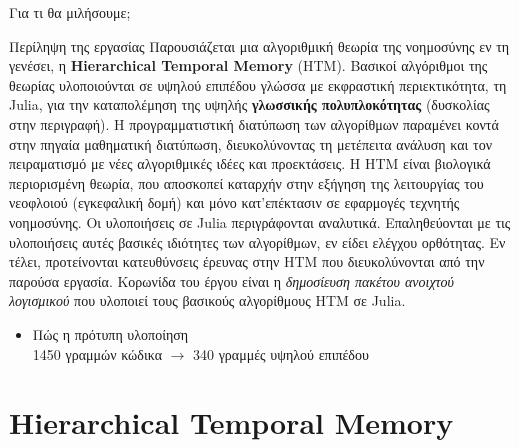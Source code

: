 \documentclass[10pt,lualatex]{beamer}
\title{\huge{\titlestring}}
\author{\authorstring\\
Επιβλέπων καθηγητής: Νίκος Πιτσιάνης}
\date{13 Ιουνίου 2019}
\begin{document}
\begin{frame}%
  \titlepage
\end{frame}

\begin{frame}{Για τι θα μιλήσουμε;}
	\begin{block}{Περίληψη της εργασίας}
		\scriptsize
		\justifying
    Παρουσιάζεται μια αλγοριθμική θεωρία της νοημοσύνης εν τη γενέσει, η \textbf{Hierarchical Temporal Memory} (HTM).
    \alert{\small Βασικοί αλγόριθμοι της θεωρίας υλοποιούνται σε υψηλού επιπέδου γλώσσα με εκφραστική περιεκτικότητα, τη Julia,
    για την καταπολέμηση της υψηλής \textbf{γλωσσικής πολυπλοκότητας}\parencite{chazelleNaturalAlgorithmsInfluence}} (δυσκολίας στην περιγραφή).
    \alert{\small Η προγραμματιστική διατύπωση των αλγορίθμων παραμένει κοντά στην πηγαία μαθηματική διατύπωση,}
    διευκολύνοντας τη μετέπειτα ανάλυση και τον πειραματισμό με νέες αλγοριθμικές ιδέες και προεκτάσεις.
    Η HTM είναι βιολογικά περιορισμένη θεωρία, που αποσκοπεί καταρχήν στην εξήγηση της λειτουργίας του νεοφλοιού (εγκεφαλική δομή)
    και μόνο κατ'επέκτασιν σε εφαρμογές τεχνητής νοημοσύνης.
    Οι υλοποιήσεις σε Julia περιγράφονται αναλυτικά.
    Επαληθεύονται με τις υλοποιήσεις αυτές βασικές ιδιότητες των αλγορίθμων, εν είδει ελέγχου ορθότητας.
    Εν τέλει, προτείνονται κατευθύνσεις έρευνας στην HTM που διευκολύνονται από την παρούσα εργασία.
    Κορωνίδα του έργου είναι η \textit{δημοσίευση πακέτου ανοιχτού λογισμικού} που υλοποιεί τους βασικούς αλγορίθμους HTM σε Julia.
	\end{block}
	\pause
	\begin{itemize}
		\item Πώς η πρότυπη υλοποίηση\\
		1450 γραμμών κώδικα $\longrightarrow$ 340 γραμμές υψηλού επιπέδου
	\end{itemize}
\end{frame}

\section{Hierarchical Temporal Memory}
\end{document}
